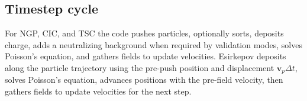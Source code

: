 \subsection{Timestep cycle}
For NGP, CIC, and TSC the code pushes particles, optionally sorts, deposits charge, adds a neutralizing background when required by validation modes, solves Poisson's equation, and gathers fields to update velocities.
Esirkepov deposits along the particle trajectory using the pre-push position and displacement $\mathbf{v}_p\Delta t$, solves Poisson's equation, advances positions with the pre-field velocity, then gathers fields to update velocities for the next step.
